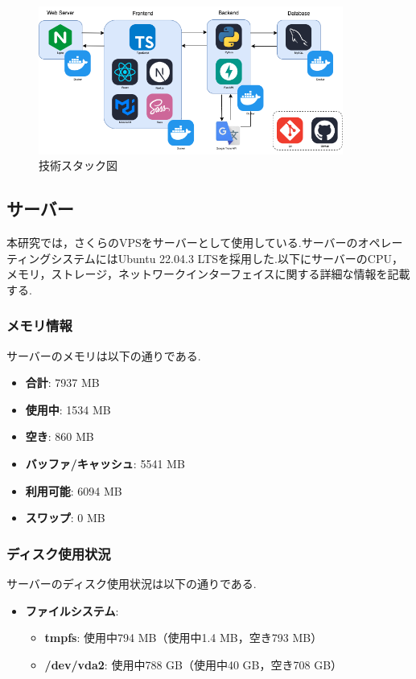 \documentclass[b5paper,12pt,dvipdfmx]{jsreport}
\begin{document}
\begin{figure}[H]
	\centering
    \includegraphics[width=100mm,height=48.58mm]{./img/system/technology_stack.png}
	\caption{技術スタック図}
	\label{fig:tech_stack}
\end{figure}


\subsection{サーバー}
本研究では，さくらのVPSをサーバーとして使用している.サーバーのオペレーティングシステムにはUbuntu 22.04.3 LTSを採用した.以下にサーバーのCPU，メモリ，ストレージ，ネットワークインターフェイスに関する詳細な情報を記載する.


\subsubsection{メモリ情報}
サーバーのメモリは以下の通りである.
\begin{itemize}
    \item \textbf{合計}: 7937 MB
    \item \textbf{使用中}: 1534 MB
    \item \textbf{空き}: 860 MB
    \item \textbf{バッファ/キャッシュ}: 5541 MB
    \item \textbf{利用可能}: 6094 MB
    \item \textbf{スワップ}: 0 MB
\end{itemize}


\subsubsection{ディスク使用状況}
サーバーのディスク使用状況は以下の通りである.
\begin{itemize}
    \item \textbf{ファイルシステム}:
    \begin{itemize}
        \item \textbf{tmpfs}: 使用中794 MB（使用中1.4 MB，空き793 MB）
        \item \textbf{/dev/vda2}: 使用中788 GB（使用中40 GB，空き708 GB）
    \end{itemize}
\end{itemize}
\end{document}
